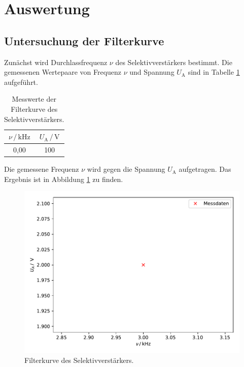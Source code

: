 \section{Auswertung}
\label{sec:Auswertung}

\subsection{Untersuchung der Filterkurve}

Zunächst wird Durchlassfrequenz $\nu$ des Selektivverstärkers bestimmt. Die 
gemessenen Wertepaare von Frequenz $\nu$ und Spannung $U_\text{A}$ sind in 
Tabelle \ref{tab:Messdaten1} aufgeführt. 

\begin{table}
\centering
\caption{Messwerte der Filterkurve des Selektivverstärkers.}
\label{tab:Messdaten1}
\begin{tabular}{c c}
\toprule
$\nu \,/\, \si{\kilo\hertz}$ & $U_\text{A} \,/\, \si{\volt}$\\
\midrule
0,00 & 100\\
\bottomrule
\end{tabular}
\end{table}

Die gemessene Frequenz $\nu$ wird gegen die Spannung $U_\text{A}$ aufgetragen. Das 
Ergebnis ist in Abbildung \ref{fig:plot1} zu finden. 

\begin{figure}
  \centering
  \includegraphics{content/plot1.pdf}
  \caption{Filterkurve des Selektivverstärkers.}
  \label{fig:plot1}
\end{figure}

